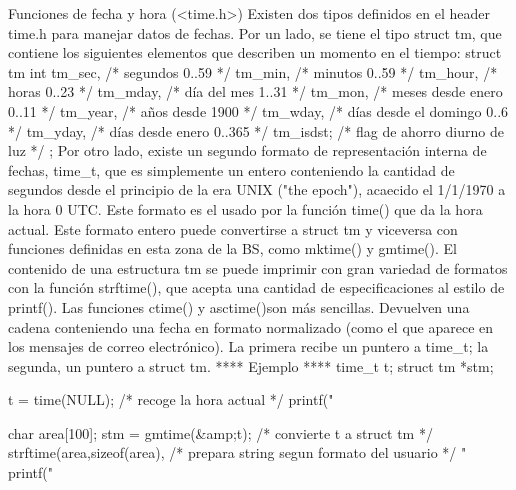 Funciones de fecha y hora (<time.h>)
Existen dos tipos definidos en el header time.h para manejar datos de fechas.
Por un lado, se tiene el tipo struct tm, que contiene los siguientes elementos
que describen un momento en el tiempo:
struct tm {
int tm_sec,    /* segundos 0..59 */
    tm_min,    /* minutos 0..59 */
    tm_hour,   /* horas 0..23 */
    tm_mday,   /* día del mes 1..31 */
    tm_mon,    /* meses desde enero 0..11 */
    tm_year,   /* años desde 1900 */
    tm_wday,   /* días desde el domingo 0..6 */
    tm_yday,   /* días desde enero 0..365 */
    tm_isdst;  /* flag de ahorro diurno de luz */
};
Por otro lado, existe un segundo formato de representación interna de fechas,
time_t, que es simplemente un entero conteniendo la cantidad de segundos desde
el principio de la era UNIX ("the epoch"), acaecido el 1/1/1970 a la hora 0
UTC. Este formato es el usado por la función time() que da la hora actual.
Este formato entero puede convertirse a struct tm y viceversa con funciones
definidas en esta zona de la BS, como mktime() y gmtime().
El contenido de una estructura tm se puede imprimir con gran variedad de
formatos con la función strftime(), que acepta una cantidad de especificaciones
al estilo de printf(). Las funciones ctime() y asctime()son más sencillas.
Devuelven una cadena conteniendo una fecha en formato normalizado (como el que
aparece en los mensajes de correo electrónico). La primera recibe un puntero a
time_t; la segunda, un puntero a struct tm.
**** Ejemplo ****
    time_t t;
    struct tm *stm;

    t = time(NULL);             /* recoge la hora actual */
    printf("%

    char area[100];
    stm = gmtime(&amp;t);           /* convierte t a struct tm */
    strftime(area,sizeof(area), /* prepara string segun formato del usuario */
        "%
    printf("%

